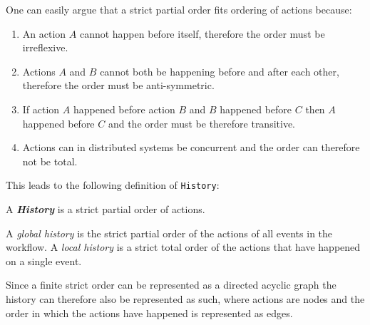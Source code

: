 	\newpar One can easily argue that a strict partial order fits ordering of actions because:
	\begin{enumerate}
		\item An action $A$ cannot happen before itself, therefore the order must be irreflexive.
		\item Actions $A$ and $B$ cannot both be happening before and after each other, therefore the order must be anti-symmetric.
		\item If action $A$ happened before action $B$ and $B$ happened before $C$ then $A$ happened before $C$ and the order must be therefore transitive.
		\item Actions can in distributed systems be concurrent and the order can therefore not be total.
	\end{enumerate}
	
	\newpar This leads to the following definition of \texttt{History}:
	
	\begin{definition}
		A \textit{\textbf{History}} is a strict partial order of actions.
	\end{definition}
	
    \noindent A \textit{global history} is the strict partial order of the actions of all events in the workflow. A \textit{local history} is a strict total order of the actions that have happened on a single event.
    
    \newpar Since a finite strict order can be represented as a directed acyclic graph the history can therefore also be represented as such, where actions are nodes and the order in which the actions have happened is represented as edges.

